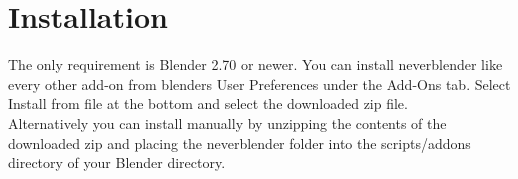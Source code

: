 \chapter{Installation}
The only requirement is Blender 2.70 or newer. You can install neverblender
like every other add-on from blenders User Preferences under the Add-Ons tab.
Select Install from file at the bottom and select the downloaded zip file. \\

Alternatively you can install manually by unzipping the contents of the
downloaded zip and placing the neverblender folder into the scripts/addons
directory of your Blender directory.
